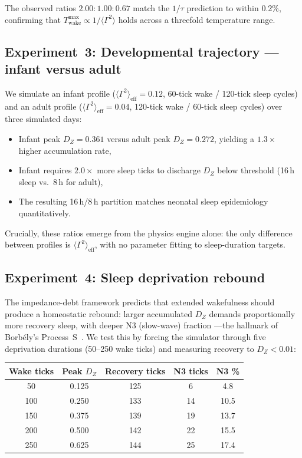 ﻿\documentclass[aps,pre,twocolumn,superscriptaddress,floatfix]{revtex4-2}
\begin{document}
The observed ratios $2.00 : 1.00 : 0.67$ match the
$1/\tau$ prediction to within 0.2\%,
confirming that $T_{\mathrm{wake}}^{\max} \propto 1/\langle\Gamma^2\rangle$
holds across a threefold temperature range.

\subsection{Experiment~3: Developmental trajectory — infant versus adult}

We simulate an infant profile
($\langle\Gamma^2\rangle_{\mathrm{eff}} = 0.12$,
60-tick wake / 120-tick sleep cycles)
and an adult profile
($\langle\Gamma^2\rangle_{\mathrm{eff}} = 0.04$,
120-tick wake / 60-tick sleep cycles)
over three simulated days:
\begin{itemize}
  \item Infant peak $D_Z = 0.361$ versus adult peak $D_Z = 0.272$,
    yielding a $1.3\times$ higher accumulation rate,
  \item Infant requires $2.0\times$ more sleep ticks to
    discharge $D_Z$ below threshold
    (16\,h sleep vs.~8\,h for adult),
  \item The resulting 16\,h/8\,h partition
    matches neonatal sleep epidemiology~\cite{Porkka2011}
    quantitatively.
\end{itemize}
Crucially, these ratios emerge from the physics engine alone:
the only difference between profiles is
$\langle\Gamma^2\rangle_{\mathrm{eff}}$,
with no parameter fitting to sleep-duration targets.

\subsection{Experiment~4: Sleep deprivation rebound}

The impedance-debt framework predicts that extended
wakefulness should produce a homeostatic rebound:
larger accumulated $D_Z$ demands proportionally more
recovery sleep, with deeper N3 (slow-wave) fraction
---the hallmark of Borb\'{e}ly's Process~S~\cite{Borbely1982}.
We test this by forcing the simulator through
five deprivation durations (50--250 wake ticks)
and measuring recovery to $D_Z < 0.01$:

\begin{center}
\begin{tabular}{ccccc}
\hline
Wake ticks & Peak $D_Z$ & Recovery ticks & N3 ticks & N3 \% \\
\hline
 50 & 0.125 & 125 &  6 &  4.8 \\
100 & 0.250 & 133 & 14 & 10.5 \\
150 & 0.375 & 139 & 19 & 13.7 \\
200 & 0.500 & 142 & 22 & 15.5 \\
250 & 0.625 & 144 & 25 & 17.4 \\
\hline
\end{tabular}
\end{center}
\end{document}
